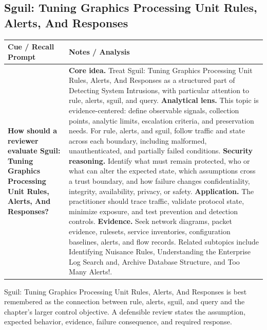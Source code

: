 \documentclass[11pt]{article}
\newcommand{\CornellHeader}{%
\rowcolor{Navy}\color{white}\bfseries Cue / Recall Prompt & \color{white}\bfseries Notes / Analysis\\\hline}
\newcommand{\CornellRow}[2]{%
\cellcolor{CueGray}\RaggedRight\textbf{#1} & \RaggedRight #2\\\hline}
\begin{document}
\subsection*{Sguil: Tuning Graphics Processing Unit Rules, Alerts, And Responses}
\begin{longtable}{>{\RaggedRight\arraybackslash}p{}|>{\RaggedRight\arraybackslash}p{}}
\CornellHeader
\CornellRow{How should a reviewer evaluate Sguil: Tuning Graphics Processing Unit Rules, Alerts, And Responses?}{\textbf{Core idea.} Treat Sguil: Tuning Graphics Processing Unit Rules, Alerts, And Responses as a structured part of Detecting System Intrusions, with particular attention to rule, alerts, sguil, and query. \textbf{Analytical lens.} This topic is evidence-centered: define observable signals, collection points, analytic limits, escalation criteria, and preservation needs. For rule, alerts, and sguil, follow traffic and state across each boundary, including malformed, unauthenticated, and partially failed conditions. \textbf{Security reasoning.} Identify what must remain protected, who or what can alter the expected state, which assumptions cross a trust boundary, and how failure changes confidentiality, integrity, availability, privacy, or safety. \textbf{Application.} The practitioner should trace traffic, validate protocol state, minimize exposure, and test prevention and detection controls. \textbf{Evidence.} Seek network diagrams, packet evidence, rulesets, service inventories, configuration baselines, alerts, and flow records. Related subtopics include Identifying Nuisance Rules, Understanding the Enterprise Log Search and, Archive Database Structure, and Too Many Alerts!.}
\end{longtable}
\begin{topicsummary}
Sguil: Tuning Graphics Processing Unit Rules, Alerts, And Responses is best remembered as the connection between rule, alerts, sguil, and query and the chapter's larger control objective. A defensible review states the assumption, expected behavior, evidence, failure consequence, and required response.
\end{topicsummary}
\end{document}
